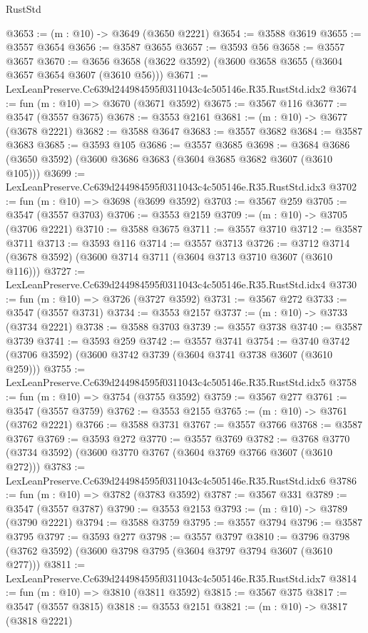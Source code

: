 \begin{lexlean}{RustStd}
\begin{coremodule}
@3653 := (m : @10) -> @3649 (@3650 @2221)
@3654 := @3588 @3619
@3655 := @3557 @3654
@3656 := @3587 @3655
@3657 := @3593 @56
@3658 := @3557 @3657
@3670 := @3656 @3658 (@3622 @3592) (@3600 @3658 @3655 (@3604 @3657 @3654 @3607 (@3610 @56)))
@3671 := LexLeanPreserve.Cc639d244984595f0311043c4c505146e.R35.RustStd.idx2
@3674 := fun (m : @10) => @3670 (@3671 @3592)
@3675 := @3567 @116
@3677 := @3547 (@3557 @3675)
@3678 := @3553 @2161
@3681 := (m : @10) -> @3677 (@3678 @2221)
@3682 := @3588 @3647
@3683 := @3557 @3682
@3684 := @3587 @3683
@3685 := @3593 @105
@3686 := @3557 @3685
@3698 := @3684 @3686 (@3650 @3592) (@3600 @3686 @3683 (@3604 @3685 @3682 @3607 (@3610 @105)))
@3699 := LexLeanPreserve.Cc639d244984595f0311043c4c505146e.R35.RustStd.idx3
@3702 := fun (m : @10) => @3698 (@3699 @3592)
@3703 := @3567 @259
@3705 := @3547 (@3557 @3703)
@3706 := @3553 @2159
@3709 := (m : @10) -> @3705 (@3706 @2221)
@3710 := @3588 @3675
@3711 := @3557 @3710
@3712 := @3587 @3711
@3713 := @3593 @116
@3714 := @3557 @3713
@3726 := @3712 @3714 (@3678 @3592) (@3600 @3714 @3711 (@3604 @3713 @3710 @3607 (@3610 @116)))
@3727 := LexLeanPreserve.Cc639d244984595f0311043c4c505146e.R35.RustStd.idx4
@3730 := fun (m : @10) => @3726 (@3727 @3592)
@3731 := @3567 @272
@3733 := @3547 (@3557 @3731)
@3734 := @3553 @2157
@3737 := (m : @10) -> @3733 (@3734 @2221)
@3738 := @3588 @3703
@3739 := @3557 @3738
@3740 := @3587 @3739
@3741 := @3593 @259
@3742 := @3557 @3741
@3754 := @3740 @3742 (@3706 @3592) (@3600 @3742 @3739 (@3604 @3741 @3738 @3607 (@3610 @259)))
@3755 := LexLeanPreserve.Cc639d244984595f0311043c4c505146e.R35.RustStd.idx5
@3758 := fun (m : @10) => @3754 (@3755 @3592)
@3759 := @3567 @277
@3761 := @3547 (@3557 @3759)
@3762 := @3553 @2155
@3765 := (m : @10) -> @3761 (@3762 @2221)
@3766 := @3588 @3731
@3767 := @3557 @3766
@3768 := @3587 @3767
@3769 := @3593 @272
@3770 := @3557 @3769
@3782 := @3768 @3770 (@3734 @3592) (@3600 @3770 @3767 (@3604 @3769 @3766 @3607 (@3610 @272)))
@3783 := LexLeanPreserve.Cc639d244984595f0311043c4c505146e.R35.RustStd.idx6
@3786 := fun (m : @10) => @3782 (@3783 @3592)
@3787 := @3567 @331
@3789 := @3547 (@3557 @3787)
@3790 := @3553 @2153
@3793 := (m : @10) -> @3789 (@3790 @2221)
@3794 := @3588 @3759
@3795 := @3557 @3794
@3796 := @3587 @3795
@3797 := @3593 @277
@3798 := @3557 @3797
@3810 := @3796 @3798 (@3762 @3592) (@3600 @3798 @3795 (@3604 @3797 @3794 @3607 (@3610 @277)))
@3811 := LexLeanPreserve.Cc639d244984595f0311043c4c505146e.R35.RustStd.idx7
@3814 := fun (m : @10) => @3810 (@3811 @3592)
@3815 := @3567 @375
@3817 := @3547 (@3557 @3815)
@3818 := @3553 @2151
@3821 := (m : @10) -> @3817 (@3818 @2221)

\end{coremodule}
\end{lexlean}
